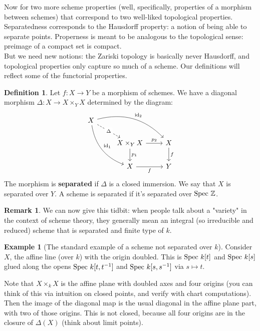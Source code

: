 \documentclass[10pt,reqno]{amsart}
\theoremstyle{definition}
\newtheorem{example}[theorem]{Example}
\newtheorem{definition}[theorem]{Definition}
\newtheorem{remark}[theorem]{Remark}
\theoremstyle{remark}
\numberwithin{equation}{section}
\numberwithin{theorem}{section}
\newcommand{\Z}{{\mathbb Z}}
\newcommand{\spec}{\textup{Spec }}
\begin{document}
Now for two more scheme properties (well, specifically, properties of a morphism between schemes) that correspond to two well-liked topological properties. Separatedness corresponds to the Hausdorff property: a notion of being able to separate points. Properness is meant to be analogous to the topological sense: preimage of a compact set is compact.
\\

But we need new notions: the Zariski topology is basically never Hausdorff, and topological properties only capture so much of a scheme. Our definitions will reflect some of the functorial properties.

\begin{definition} Let $f: X \to Y$ be a morphism of schemes. We have a diagonal morphism $\Delta: X \to X \times_Y X$ determined by the diagram:
\[\begin{tikzcd}
X
\arrow[drr, bend left, "\textup{id}_2"]
\arrow[ddr, bend right, "\textup{id}_1"]
\arrow[dr, dashed, "\Delta" description] & & \\
& X \times_Y X \arrow[r, "p_2"] \arrow[d, "p_1"]
& X \arrow[d, "f"] \\
& X \arrow[r, swap, "f"]
& Y
\end{tikzcd}
\]
The morphism is \textbf{separated} if $\Delta$ is a closed immersion. We say that $X$ is separated over $Y$. A scheme is separated if it's separated over $\spec \Z$.
\end{definition}

\begin{remark} We can now give this tidbit: when people talk about a "variety" in the context of scheme theory, they generally mean an integral (so irreducible and reduced) scheme that is separated and finite type of $k$.
\end{remark}

\begin{example}[The standard example of a scheme not separated over $k$] Consider $X$, the affine line (over $k$) with the origin doubled. This is $\spec k[t]$ and $\spec k[s]$ glued along the opens $\spec k[t,t^{-1}]$ and $\spec k[s,s^{-1}]$ via $s \mapsto t$.

Note that $X \times_k X$ is the affine plane with doubled axes and four origins (you can think of this via intuition on closed points, and verify with chart computations). Then the image of the diagonal map is the usual diagonal in the affine plane part, with two of those origins. This is not closed, because all four origins are in the closure of $\Delta(X)$ (think about limit points).
\end{example}
\end{document}
